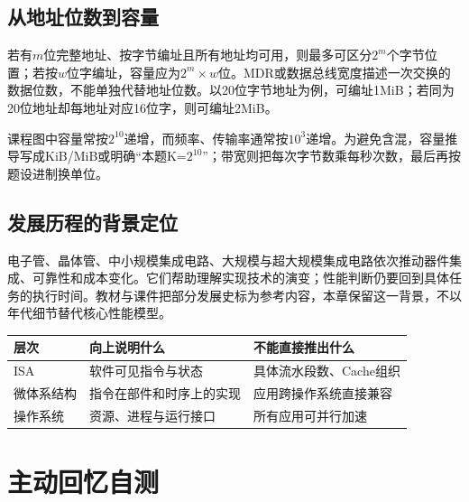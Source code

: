 \subsection{从地址位数到容量}\label{CO01-capacity}

若有\(m\)位完整地址、按字节编址且所有地址均可用，则最多可区分\(2^m\)个字节位置；若按\(w\)位字编址，容量应为\(2^m\times w\)位。MDR或数据总线宽度描述一次交换的数据位数，不能单独代替地址位数。以20位字节地址为例，可编址1MiB；若同为20位地址却每地址对应16位字，则可编址2MiB。

课程图中容量常按\(2^{10}\)递增，而频率、传输率通常按\(10^3\)递增。为避免含混，容量推导写成KiB/MiB或明确``本题K=\(2^{10}\)''；带宽则把每次字节数乘每秒次数，最后再按题设进制换单位。

\subsection{发展历程的背景定位}\label{CO01-history}

电子管、晶体管、中小规模集成电路、大规模与超大规模集成电路依次推动器件集成、可靠性和成本变化。它们帮助理解实现技术的演变；性能判断仍要回到具体任务的执行时间。教材与课件把部分发展史标为参考内容，本章保留这一背景，不以年代细节替代核心性能模型。

\begin{wideblock}

\par\medskip\noindent\begin{minipage}{\linewidth}\fontsize{9.3}{12}\selectfont\begin{tabularx}{\linewidth}{@{}YYY@{}}
\toprule\noalign{}
层次 & 向上说明什么 & 不能直接推出什么 \\
\midrule\noalign{}


ISA & 软件可见指令与状态 & 具体流水段数、Cache组织 \\
微体系结构 & 指令在部件和时序上的实现 & 应用跨操作系统直接兼容 \\
操作系统 & 资源、进程与运行接口 & 所有应用可并行加速 \\
\bottomrule\end{tabularx}
\end{minipage}\par\medskip

\end{wideblock}

\section{主动回忆自测}\label{CO01-recall}

